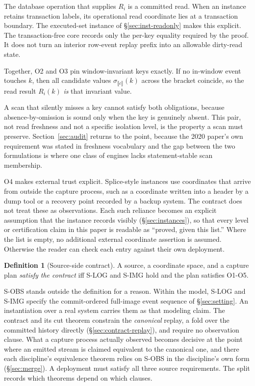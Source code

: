 \documentclass[sigconf,nonacm,10pt]{acmart}
\theoremstyle{plain}
\theoremstyle{definition}
\newtheorem{definition}{Definition}[section]
\newcommand{\den}[1]{\llbracket #1 \rrbracket}   %
\begin{document}
The database operation that supplies $R_i$ is a committed read. When an
instance retains transaction labels, its operational read coordinate lies
at a transaction boundary. The executed-set instance of
\S\ref{sec:inst-readonly} makes this explicit. The transaction-free core
records only the per-key equality required by the proof. It does not
turn an interior row-event replay prefix into an allowable dirty-read
state.

Together, O2 and O3 pin window-invariant keys exactly. If no
in-window event touches $k$, then all candidate values
$\sigma_{\den{c}}(k)$ across the bracket coincide, so the read
result $R_i(k)$ \emph{is} that invariant value.

A scan that silently misses a key cannot satisfy both obligations,
because absence-by-omission is sound only when the key is genuinely absent.
This pair, not read freshness and not a specific isolation level, 
is the property a scan must preserve. Section~\ref{sec:audit} returns to
the point, because the 2020 paper's own requirement was stated in
freshness vocabulary and the gap between the two formulations is where
one class of engines lacks statement-stable scan membership.

O4 makes external trust explicit. Splice-style instances use
coordinates that arrive from outside the capture process,
such as a coordinate written into a header by a dump tool or a recovery point
recorded by a backup system. The contract does not treat these as observations. 
Each such reliance becomes an explicit assumption 
that the instance records visibly (\S\ref{sec:instances}), 
so that every level or certification claim in this paper is
readable as ``proved, given this list.'' Where the list is empty,
no additional external coordinate assertion is assumed.
Otherwise the reader can check each entry against their own deployment.

\begin{definition}[Source-side contract]\label{def:contract}
A source, a coordinate space, and a capture plan \emph{satisfy the
contract} iff S-LOG and S-IMG hold and the plan satisfies
O1-O5.
\end{definition}

S-OBS stands outside the definition for a reason. Within the model, 
S-LOG and S-IMG specify the commit-ordered full-image event sequence 
of \S\ref{sec:setting}. An instantiation over a real system carries 
them as that modeling claim. The
contract and its cut theorem constrain the \emph{canonical}
replay, a fold over the committed history directly
(\S\ref{sec:contract-replay}), and require no observation clause.
What a capture process actually observed becomes decisive at the point where an emitted stream is claimed
equivalent to the canonical one, and there each discipline's
equivalence theorem relies on S-OBS in the discipline's own form
(\S\ref{sec:merge}). A deployment must satisfy all three source requirements. The
split records which theorems depend on which clauses.
\end{document}
